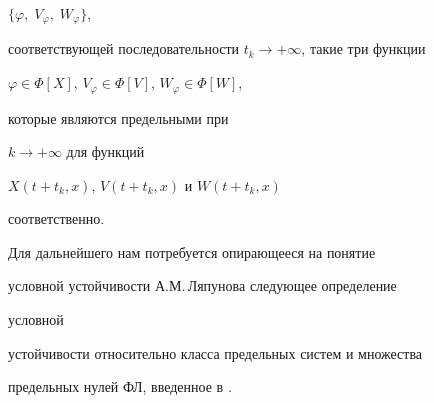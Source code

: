 $\{\varphi,\;V_\varphi,\;W_\varphi\}$, 


соответствующей последовательности $t_k\to+\infty$, такие три функции 


$\varphi\in\Phi[X]$, $V_\varphi\in\Phi[V]$, $W_\varphi\in\Phi[W]$, 


которые являются предельными при 


$k\to +\infty$ для функций 


$X(t+t_k,x)$, $V(t+t_k,x)$ и $W(t+t_k,x)$ 


соответственно. 


Для дальнейшего нам потребуется опирающееся на понятие 


условной устойчивости А.М.\,Ляпунова \cite{Lya} следующее определение 


условной 


устойчивости относительно класса предельных систем и множества 


предельных нулей ФЛ, введенное в \cite{Kos3}. 


 




